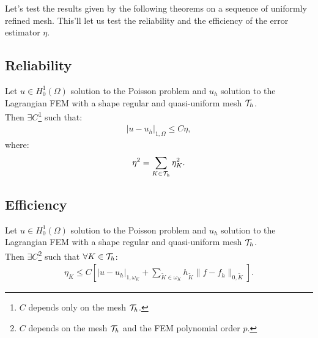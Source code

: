 Let's test the results given by the following theorems on a sequence of uniformly refined mesh. This'll let us test the reliability and the efficiency of the error estimator $\eta$.

\subsection{Reliability}

\begin{theorem}[Reliability]
	Let $u \in H_0^1(\Omega)$ solution to the Poisson problem and $u_h$ solution to the Lagrangian FEM with a shape regular and quasi-uniform mesh $\mathcal{T}_h$. \\
	Then $\exists C$\footnote{$C$ depends only on the mesh $\mathcal{T}_h$.} such that:
	\begin{gather}
		\lvert u - u_h \rvert_{1, \Omega} \leq C \eta,
	\end{gather}
	where:
	\begin{gather}
		\eta^2 = \sum_{K \in \mathcal{T}_h} \eta_K^2.
	\end{gather}
\end{theorem}

\subsection{Efficiency}

\begin{theorem}[Efficiency]
	Let $u \in H_0^1(\Omega)$ solution to the Poisson problem and $u_h$ solution to the Lagrangian FEM with a shape regular and quasi-uniform mesh $\mathcal{T}_h$. \\
	Then $\exists C$\footnote{$C$ depends on the mesh $\mathcal{T}_h$ and the FEM polynomial order $p$.} such that $\forall K \in \mathcal{T}_h$:
	\begin{gather}
		\eta_K \leq C \left[ \lvert u - u_h \rvert_{1, \omega_K} + \sum_{\tilde{K} \in \omega_K} h_{\tilde{K}} \lVert f - f_h \rVert_{0, \tilde{K}} \right].
	\end{gather}
\end{theorem}